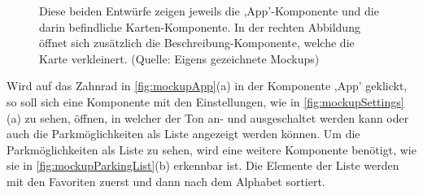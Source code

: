 \begin{figure}[h!]
	\centering
	\qquad
	\caption[Diese beiden Entwürfe zeigen jeweils die ,App'-Komponente und die darin befindliche Karten-Komponente. In der rechten Abbildung öffnet sich zusätzlich die Beschreibung-Komponente, welche die Karte verkleinert.]{Diese beiden Entwürfe zeigen jeweils die ,App'-Komponente und die darin befindliche Karten-Komponente. In der rechten Abbildung öffnet sich zusätzlich die Beschreibung-Komponente, welche die Karte verkleinert. (Quelle: Eigens gezeichnete Mockups)}
	\label{fig:mockupApp}
	\label{fig:mockupBeschreibung}
\end{figure}

Wird auf das Zahnrad in \autoref{fig:mockupApp}(a) in der Komponente ,App' geklickt, so soll sich eine Komponente mit den Einstellungen, wie in \autoref{fig:mockupSettings}(a) zu sehen, öffnen, in welcher der Ton an- und ausgeschaltet werden kann oder auch die Parkmöglichkeiten als Liste angezeigt werden können. Um die Parkmöglichkeiten als Liste zu sehen, wird eine weitere Komponente benötigt, wie sie in \autoref{fig:mockupParkingList}(b) erkennbar ist. Die Elemente der Liste werden mit den Favoriten zuerst und dann nach dem Alphabet sortiert. 

